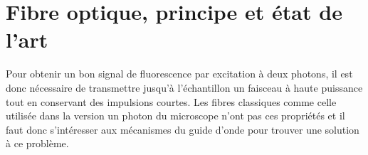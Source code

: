 


\section{Fibre optique, principe et état de l'art}

Pour obtenir un bon signal de fluorescence par excitation à deux photons, il est donc nécessaire de transmettre jusqu'à l'échantillon un faisceau à haute puissance tout en conservant des impulsions courtes. Les fibres classiques comme celle utilisée dans la version un photon du microscope n'ont pas ces propriétés et il faut donc s'intéresser aux mécanismes du guide d'onde pour trouver une solution à ce problème.

